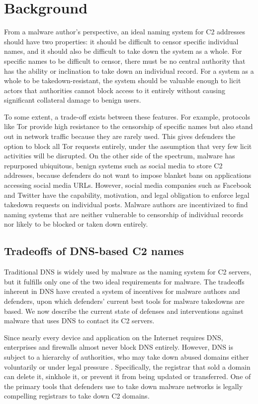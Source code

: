 \section{Background}

From a malware author's perspective, an ideal naming system for C2 
addresses should have two properties: it should be difficult to censor specific 
individual names, and it should also be difficult to take down the system as a 
whole. For specific names to be difficult to censor, there must be no central 
authority that has the ability or inclination to take down an individual 
record. For a system as a whole to be takedown-resistant, the system should be 
valuable enough to licit actors that authorities cannot block access to it 
entirely without causing significant collateral damage to benign users.

To some extent, a trade-off exists between these features. For example,  
protocols like Tor provide high resistance to the 
censorship of specific names but also stand out in network traffic because they 
are rarely used. This gives defenders the option to block all Tor requests 
entirely, under the assumption that very few licit activities will be 
disrupted. On the other side of 
the spectrum, malware has repurposed ubiquitous, benign systems 
such as social media to store C2 addresses, because defenders do not 
want to impose blanket bans on applications accessing social 
media URLs. However, social media companies such as Facebook and 
Twitter have the capability, motivation, and legal obligation to enforce 
legal takedown requests on individual posts. Malware authors are incentivized 
to find naming systems that are neither vulnerable to censorship of individual 
records nor likely to be blocked or taken down entirely.

\subsection{Tradeoffs of DNS-based C2 names}

Traditional DNS is widely used by malware as the naming system for C2 
servers, but it fulfills only one of the two ideal requirements for malware. 
The tradeoffs inherent in DNS have created a system of incentives for malware 
authors and defenders, upon which defenders' current best tools for malware 
takedowns are based. We now describe the current state of defenses and 
interventions against malware that uses DNS to contact its C2 servers.
 
Since nearly every device and application on the Internet 
requires DNS, enterprises and firewalls almost never block DNS entirely. 
However, DNS is subject to a hierarchy of authorities, who may take down abused 
domains either voluntarily or under legal pressure . Specifically, the 
registrar that sold a domain can delete it, sinkhole it, or 
prevent it from being updated or transferred. One of the primary tools that 
defenders use to take down malware networks is legally compelling registrars to 
take down C2 domains.

